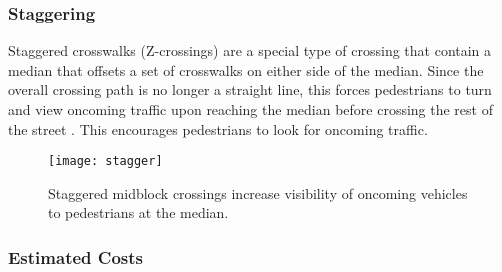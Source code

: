 \subsubsection{Staggering}

Staggered crosswalks (Z-crossings) are a special type of crossing that contain a median that offsets a set of crosswalks on either side of the median.  Since the overall crossing path is no longer a straight line, this forces pedestrians to turn and view oncoming traffic upon reaching the median before crossing the rest of the street \cite{mid2}.  This encourages pedestrians to look for oncoming traffic.

\begin{figure}
\centering
\texttt{[image: stagger]}
\caption[Staggered Crossing]{Staggered midblock crossings increase visibility of oncoming vehicles to pedestrians at the median\cite{mid3}.}
\end{figure}

\clearpage

\subsubsection{Estimated Costs}


